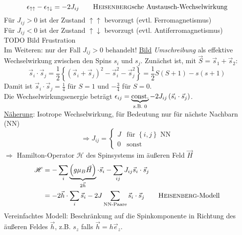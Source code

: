 \begin{equation}
    \epsilon_{\uparrow \uparrow} - \epsilon_{\uparrow \downarrow} = - 2 J_{ij} \qquad \text{\textsc{Heisenberg}sche Austausch-Wechselwirkung}
\end{equation}
Für $J_{ij} > 0$ ist der Zustand $\uparrow \uparrow$ bevorzugt (evtl. Ferromagnetismus) \\
Für $J_{ij} < 0$ ist der Zustand $\uparrow \downarrow$ bevorzugt (evtl. Antiferromagnetismus)\\
TODO Bild Frustration \\ %
Im Weiteren: nur der Fall $J_{ij} > 0$ behandelt!
\underline{Bild} \emph{Umschreibung} als effektive Wechselwirkung zwischen den Spins $s_i$ und $s_j$. Zunächst ist,
mit $\vec{S} = \vec{s}_1 + \vec{s}_2$:
\begin{equation}
    \vec{s}_i \cdot \vec{s}_j = \frac{1}{2} \left\{ \left( \vec{s}_i + \vec{s}_j \right)^2 - \vec{s}_i^2 - \vec{s}_j^2  \right\} = \frac{1}{2} S (S + 1) - s(s+1)
\end{equation}
Damit ist $\vec{s}_i \cdot \vec{s}_j = \frac{1}{4} $ für $S = 1$ und $-\frac{3}{4}$ für $S = 0$. \\
Die Wechselwirkungsenergie beträgt $\epsilon_{ij} = \underbrace{\text{const.}}_{\text{z.B. } 0} - 2 J_{ij} \left( \vec{s}_i \cdot \vec{s}_j  \right) $.\\
\underline{Näherung}: Isotrope Wechselwirkung, für Bedeutung nur für nächste Nachbarn (NN)
\begin{equation}
    \Rightarrow J_{ij} =
    \begin{cases}
        J & \text{für } \left\{ i, j \right\} \text{ NN} \\
        0 & \text{sonst}
    \end{cases}
\end{equation}
$\Rightarrow$ Hamilton-Operator $\mathscr{H}$ des Spinsystems im äußeren Feld $\vec{H}$
\begin{equation}
    \begin{split}
        \mathscr{H} &= - \sum_i \underbrace{\left( g \mu_B \vec{H} \right)}_{2 \vec{h}} \cdot \vec{s}_i - \sum_{ij} J_{ij} \vec{s}_i \cdot \vec{s}_j \\
        &= - 2 \vec{h} \cdot \sum_i \vec{s}_i - 2 J \sum_{\text{NN-Paare}} \vec{s}_i \cdot \vec{s}_j \qquad \text{\textsc{Heisenberg}-Modell}
    \end{split}
\end{equation}
Vereinfachtes Modell: Beschränkung auf die Spinkomponente in Richtung des äußeren Feldes $\vec{h}$, z.B. $s_z$ falls $\vec{h} = h \vec{e}_z$.
